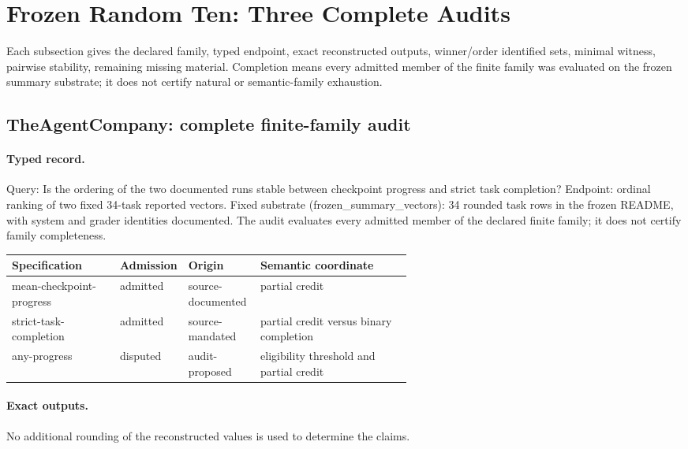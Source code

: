\section{Frozen Random Ten: Three Complete Audits}\label{app:r8-random-complete}
Each subsection gives the declared family, typed endpoint, exact reconstructed outputs, winner/order identified sets, minimal witness, pairwise stability, remaining missing material.  Completion means every admitted member of the finite family was evaluated on the frozen summary substrate; it does not certify natural or semantic-family exhaustion.

\subsection{TheAgentCompany: complete finite-family audit}\label{app:r8-theagentcompany}

\paragraph{Typed record.} Query: Is the ordering of the two documented runs stable between checkpoint progress and strict task completion? Endpoint: ordinal ranking of two fixed 34-task reported vectors. Fixed substrate (frozen\_summary\_vectors): 34 rounded task rows in the frozen README, with system and grader identities documented. The audit evaluates every admitted member of the declared finite family; it does not certify family completeness.

\begingroup
\scriptsize
\begin{tabularx}{\linewidth}{@{}p{0.27\linewidth}p{0.14\linewidth}p{0.18\linewidth}X@{}}
\toprule
Specification & Admission & Origin & Semantic coordinate \\
\midrule
mean-checkpoint-progress & admitted & source-documented & partial credit \\
strict-task-completion & admitted & source-mandated & partial credit versus binary completion \\
any-progress & disputed & audit-proposed & eligibility threshold and partial credit \\
\bottomrule
\end{tabularx}
\endgroup

\paragraph{Exact outputs.} No additional rounding of the reconstructed values is used to determine the claims.

